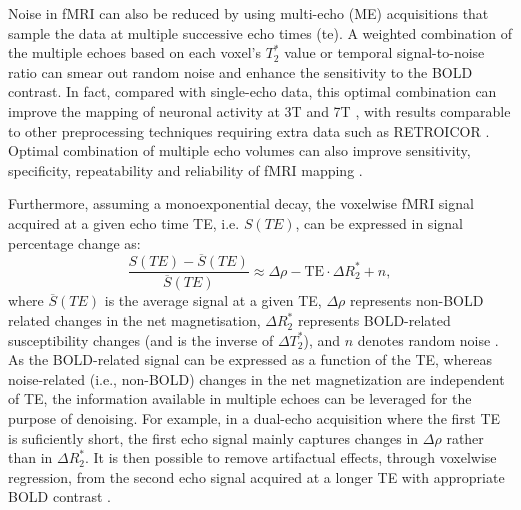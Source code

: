 Noise in fMRI can also be reduced by using multi-echo (ME) acquisitions that
sample the data at multiple successive echo times (\acrshort*{te}). A weighted
combination of the multiple echoes based on each voxel's $T_2^*$ value
\citep{Posse1999EnhancementBOLDcontrast} or temporal signal-to-noise ratio
\citep{Poser2006BOLDcontrastsensitivity} can smear out random noise and enhance
the sensitivity to the BOLD contrast. In fact, compared with single-echo data,
this optimal combination \citep{Liu2022geometricviewsignal} can improve the
mapping of neuronal activity at 3T \citep{Fernandez2017MultiechoEPI} and 7T
\citep{Puckett2018Usingmultiecho}, with results comparable to other
preprocessing techniques requiring extra data such as RETROICOR
\citep{Atwi2018AttentionRelatedBrain}. Optimal combination of multiple echo
volumes can also improve sensitivity, specificity, repeatability and reliability
of fMRI mapping
\citep{Cohen2021ImprovingBreathHolding,Cohen2019ImprovingAssessmentBreath}.

Furthermore, assuming a monoexponential decay, the voxelwise fMRI signal
acquired at a given echo time TE, i.e. $S(TE)$, can be expressed in signal
percentage change as:
\begin{equation}
    \frac{S(TE)-\overline{S}(TE)}{\overline{S}(TE)}\approx \Delta \rho - \text{TE} \cdot \Delta R_2^* + n,
\end{equation}
where $\overline{S}(TE)$ is the average signal at a given TE, $\Delta \rho$
represents non-BOLD related changes in the net magnetisation, $\Delta R_2^*$
represents BOLD-related susceptibility changes (and is the inverse of $\Delta
T_2^*$), and $n$ denotes random noise
\citep{Kundu2013Integratedstrategyimproving,Kundu2012DifferentiatingBOLDnon}. As
the BOLD-related signal can be expressed as a function of the TE, whereas
noise-related (i.e., non-BOLD) changes in the net magnetization are independent
of TE, the information available in multiple echoes can be leveraged for the
purpose of denoising. For example, in a dual-echo acquisition where the first TE
is suficiently short, the first echo signal mainly captures changes in $\Delta
\rho$ rather than in $\Delta R_2^*$. It is then possible to remove artifactual
effects, through voxelwise regression, from the second echo signal acquired at a
longer TE with appropriate BOLD contrast
\citep{Bright2013Removingmotionphysiological}.

